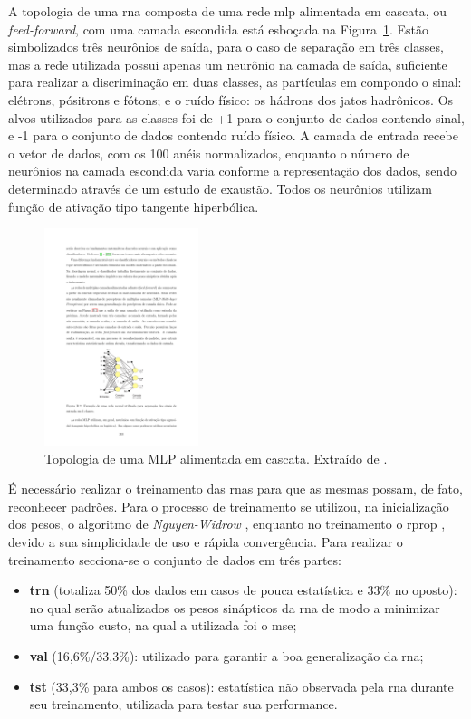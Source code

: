 A topologia de uma \gls{rna} composta de uma rede \gls{mlp} alimentada em
cascata, ou \emph{feed-forward}, com uma camada escondida está esboçada na
Figura~\ref{fig:topologia_rna}. Estão simbolizados três neurônios de saída, para
o caso de separação em três classes, mas a rede utilizada possui apenas um neurônio na camada de saída,
suficiente para realizar a discriminação em duas classes, as partículas \gls{em}
compondo o sinal: elétrons, pósitrons e fótons; e o ruído físico: os
hádrons dos jatos hadrônicos. Os alvos utilizados para as classes foi de +1 para o
conjunto de dados contendo sinal, e -1 para o conjunto de dados contendo ruído físico.
A camada de entrada recebe o vetor de dados, com os 100 anéis normalizados, enquanto o número de 
neurônios na camada escondida varia conforme a representação dos dados, 
sendo determinado através de um estudo de exaustão. Todos os neurônios utilizam
função de ativação tipo tangente hiperbólica.

\begin{figure}[ht!]
\label{fig:topologia_rna}
\centering
\includegraphics[width=0.4\textwidth]{imagens/topologia_rna.pdf}
\caption[Topologia de uma MLP alimentada em cascata.]{Topologia de uma
MLP alimentada em cascata. Extraído de \cite{tese_eduardo}.}
\end{figure}

É necessário realizar o treinamento das \glspl{rna} para que as mesmas possam, de
fato, reconhecer padrões. Para o processo de treinamento se
utilizou, na inicialização dos pesos, o algoritmo de \emph{Nguyen-Widrow} \cite{initnw}, 
enquanto no treinamento o \gls{rprop} \cite{rprop}, devido a sua simplicidade de uso e 
rápida convergência. Para realizar o treinamento secciona-se o conjunto de dados
em três partes: 

\begin{itemize} 
\item \textbf{\gls{trn}} (totaliza 50\% dos dados em
casos de pouca estatística e 33\% no oposto): 
no qual serão atualizados os pesos sinápticos da \gls{rna} de modo a minimizar uma função 
custo, na qual a utilizada foi o \gls{mse};
\item \textbf{\gls{val}} (16,6\%/33,3\%): utilizado para garantir a boa 
generalização da \gls{rna}; 
\item \textbf{\gls{tst}} (33,3\% para ambos os casos): 
estatística não observada pela \gls{rna} durante seu treinamento, utilizada para 
testar sua performance. 
\end{itemize}

